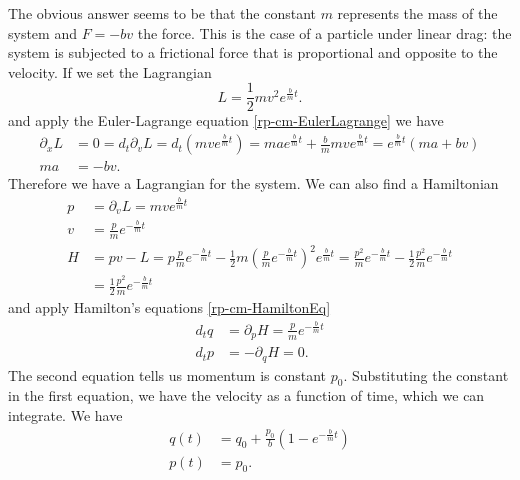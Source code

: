 The obvious answer seems to be that the constant $m$ represents the mass of the system and $F = -bv$ the force. This is the case of a particle under linear drag:  the system is subjected to a frictional force that is proportional and opposite to the velocity. If we set the Lagrangian
\begin{equation}\label{rp-cm-frictionLagrangian}
	L = \frac{1}{2} m v^2 e^{\frac{b}{m}t}.
\end{equation}
and apply the Euler-Lagrange equation \ref{rp-cm-EulerLagrange} we have
\begin{equation}
	\begin{aligned}
	\partial_x L &= 0 = d_t \partial_v L = d_t \left(m v e^{\frac{b}{m}t} \right)=mae^{\frac{b}{m}t} + \frac{b}{m} m v e^{\frac{b}{m}t} = e^{\frac{b}{m}t}(ma + bv) \\
	ma &= - bv.
	\end{aligned}
\end{equation}
Therefore we have a Lagrangian for the system. We can also find a Hamiltonian
\begin{equation}\label{rp-cm-momentumHamiltonian}
	\begin{aligned}
	p &= \partial_v L = m v e^{\frac{b}{m}t} \\
		v &= \frac{p}{m} e^{-\frac{b}{m}t} \\
		H &= p v - L = p \frac{p}{m} e^{-\frac{b}{m}t} - \frac{1}{2} m \left( \frac{p}{m} e^{-\frac{b}{m}t} \right)^2 e^{\frac{b}{m}t} = \frac{p^2}{m}  e^{-\frac{b}{m}t} - \frac{1}{2} \frac{p^2}{m}  e^{-\frac{b}{m}t} \\ 
		&=\frac{1}{2} \frac{p^2}{m}  e^{-\frac{b}{m}t}
	\end{aligned}
\end{equation}
and apply Hamilton's equations \ref{rp-cm-HamiltonEq}
\begin{equation}
	\begin{aligned}
		d_t q &= \partial_p H = \frac{p}{m}  e^{-\frac{b}{m}t} \\
		d_t p &= - \partial_q H = 0. 
	\end{aligned}
\end{equation}
The second equation tells us momentum is constant $p_0$. Substituting the constant in the first equation, we have the velocity as a function of time, which we can integrate. We have
\begin{equation}
	\begin{aligned}
	q(t) &= q_0 + \frac{p_0}{b} \left( 1 - e^{-\frac{b}{m}t}\right) \\
	p(t) &= p_0.
	\end{aligned}
\end{equation}

